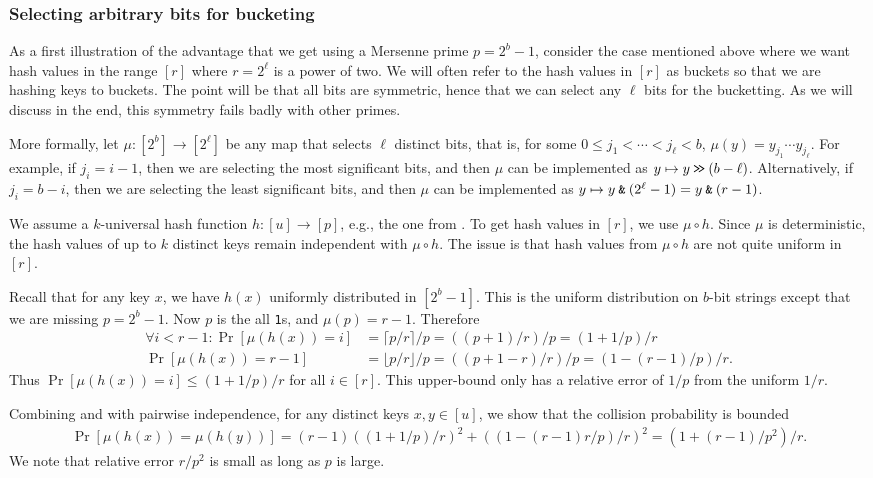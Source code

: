 \subsubsection{Selecting arbitrary bits for bucketing}\label{sec:power-of-two}
As a first illustration of the advantage that we get using a Mersenne
prime $p=2^b-1$, consider the case mentioned above where we want hash
values in the range $[r]$ where $r=2^\ell$ is a power of two. We will
often refer to the hash values in $[r]$ as buckets so that we are
hashing keys to buckets. The point will be that all bits are
symmetric, hence that we can select any $\ell$ bits for the
bucketting. As we will discuss in the end, this symmetry fails badly
with other primes.

More formally, let $\mu:[2^b]\to[2^\ell]$ be any map that selects
$\ell$ distinct bits, that is, for some $0\leq j_1<\cdots<j_{\ell}<b$,
$\mu(y)=y_{j_1}\cdots y_{j_\ell}$. For example, if $j_i=i-1$, then we
are selecting the most significant bits, and then $\mu$ can be
implemented as $y\mapsto y\mathbin{\texttt{>\!>}} (b-\ell)$. Alternatively, if $j_i=b-i$,
then we are selecting the least significant bits, and then $\mu$ can
be implemented as $y\mapsto y\mathbin{\texttt{\&}} (2^\ell-1)=y\mathbin{\texttt{\&}} (r-1)$.


We assume a $k$-universal hash function $h:[u]\to[p]$, e.g.,
the one from . To get hash values in $[r]$,
we use $\mu\circ h$. Since $\mu$ is deterministic,
the hash values of up to $k$ distinct keys remain
independent with $\mu\circ h$. The issue is that hash values from 
$\mu\circ h$ are not quite uniform in $[r]$.

Recall that for any key $x$, we have $h(x)$ uniformly distributed in $[2^b-1]$.
This is the uniform distribution on $b$-bit strings except that we are
missing $p=2^b-1$. Now $p$ is the all \texttt{1}s, and 
$\mu(p) = r-1$.
Therefore
\begin{align}
   \forall i < r-1:
   \Pr[\mu(h(x))=i]
   &=\lceil p/r\rceil/p
   =((p+1)/r)/p
   =(1+1/p)/r
   \label{eq:coll-ell<r-1}
   \\
     \Pr[\mu(h(x))=r-1]
   &=\lfloor p/r\rfloor/p=((p+1-r)/r)/p
   =(1-(r-1)/p)/r.
   \label{eq:coll-ell=r-1}
\end{align}
Thus $\Pr[\mu(h(x))=i]\leq (1+1/p)/r$ for all $i\in[r]$. This upper-bound
only has a relative error of $1/p$ from the uniform $1/r$.

Combining  and  with
pairwise independence, for any distinct keys $x,y\in [u]$, we show that the
collision probability is bounded
\begin{align*}
   \Pr[\mu(h(x))=\mu(h(y))]
      =(r-1)((1+1/p)/r)^2+((1-(r-1)r/p)/r)^2
      =(1+(r-1)/p^2)/r
   .%
\end{align*}
We note that relative error $r/p^2$ is small as long as $p$ is
large.

